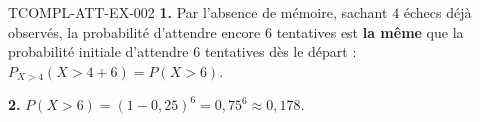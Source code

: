 \begin{corrige}{TCOMPL-ATT-EX-002}
\textbf{1.} Par l'absence de mémoire, sachant $4$ échecs déjà observés, la probabilité d'attendre encore $6$ tentatives est \textbf{la même} que la probabilité initiale d'attendre $6$ tentatives dès le départ : $P_{X>4}(X>4+6) = P(X>6)$.

\textbf{2.} $P(X>6) = (1-0{,}25)^6 = 0{,}75^6 \approx 0{,}178$.
\end{corrige}
